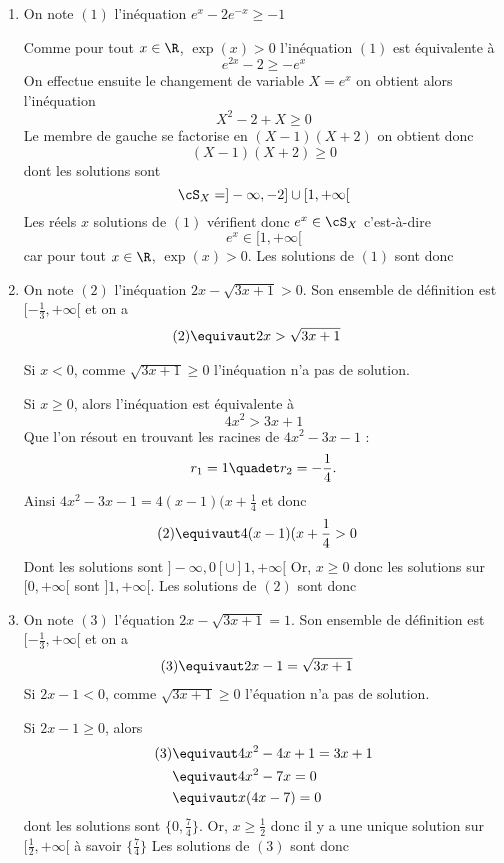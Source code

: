 \documentclass[a4paper, 11pt,reqno]{article}
\begin{document}
\begin{correction}
\begin{enumerate}
\item On note $(1)$ l'inéquation $e^{x}-2e^{-x}\geq -1$

Comme pour tout $x\in \R$, $\exp(x)>0$ l'inéquation $(1)$ est équivalente à 
$$e^{2x} -2\geq -e^x$$
On effectue ensuite le changement de variable $X=e^{x}$ on obtient alors l'inéquation 
$$X^2 -2 +X\geq 0$$
Le membre de gauche se factorise en $(X-1)(X+2)$ on obtient donc
$$(X-1)(X+2) \geq 0$$ dont les solutions sont 
$$\cS_X= ]-\infty,-2] \cup [1,+\infty[$$
Les réels $x$ solutions de $(1)$ vérifient donc $e^x \in \cS_X$ c'est-à-dire 
$$e^x\in  [1,+\infty[$$
car  pour tout $x\in \R$, $\exp(x)>0$. Les solutions de $(1)$ sont donc 
\conclusion{ $\cS_1= [0,+\infty[$}

\item  On note $(2)$ l'inéquation $2x-\sqrt{3x+1} >0$. Son ensemble de définition est $[-\frac{1}{3}, +\infty[$ et on a 
\begin{align*}
(2) \equivaut & 2x > \sqrt{3x+1} 
\end{align*}

Si $x<0$, comme $\sqrt{3x+1} \geq 0$ l'inéquation n'a pas de solution. 

Si $x\geq 0$, alors l'inéquation est équivalente à 
$$4x^2 > 3x+1$$
Que l'on résout en trouvant les racines de $4x^2-3x-1$ :
$$r_1 = 1 \quadet r_2 = -\frac{1}{4}.$$
Ainsi
$4x^2-3x-1 = 4(x-1)(x+\frac{1}{4}$ et donc 
\begin{align*}
(2) \equivaut & 4(x-1)(x+\frac{1}{4}> 0
\end{align*}
Dont les solutions sont $]-\infty, 0[\cup ]1,+\infty[$ Or, $x\geq 0$ donc les solutions  sur $[0,+\infty[$ sont $]1,+\infty[$. 
Les solutions de $(2)$ sont donc 
\conclusion{ $\cS_2= ]1,+\infty[$}

\item On note $(3)$ l'équation $2x-\sqrt{3x+1} =1$. Son ensemble de définition est $[-\frac{1}{3}, +\infty[$ et on a 
\begin{align*}
(3) \equivaut & 2x -1= \sqrt{3x+1} 
\end{align*}
Si $2x-1<0$, comme $\sqrt{3x+1} \geq 0$ l'équation n'a pas de solution. 

Si $2x-1\geq 0$, alors 
\begin{align*}
(3) \equivaut & 4x^2 -4x+1= 3x+1\\
	\equivaut & 4x^2-7x=0\\
	\equivaut & x (4x-7)=0
\end{align*}
dont les solutions sont  $\{ 0, \frac{7}{4}\}$. Or, $x\geq \frac{1}{2}$ donc il y a une unique solution sur $[\frac{1}{2}, +\infty[$ à savoir $\{ \frac{7}{4}\}$
Les solutions de $(3)$ sont donc 



\end{enumerate}
\end{correction}
\end{document}
